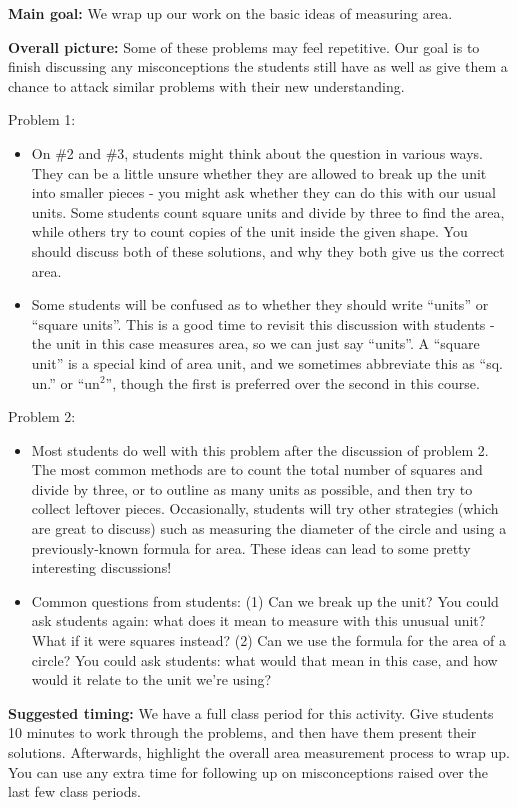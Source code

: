 \documentclass[nooutcomes,noauthor]{ximera}
\begin{document}
\newpage


\begin{instructorNotes}

{\bf Main goal:} We wrap up our work on the basic ideas of measuring area.

{\bf Overall picture:} Some of these problems may feel repetitive. Our goal is to finish discussing any misconceptions the students still have as well as give them a chance to attack similar problems with their new understanding.


Problem 1:
\begin{itemize}
\item    On \#2 and \#3, students might think about the question in various ways.  They can be a little unsure whether they are allowed to break up the unit into smaller pieces - you might ask whether they can do this with our usual units.  Some students count square units and divide by three to find the area, while others try to count copies of the unit inside the given shape.  You should discuss both of these solutions, and why they both give us the correct area.
    
\item    Some students will be confused as to whether they should write ``units'' or ``square units''.  This is a good time to revisit this discussion with students - the unit in this case measures area, so we can just say ``units''.  A ``square unit'' is a special kind of area unit, and we sometimes abbreviate this as ``sq. un.'' or ``un$^2$'', though the first is preferred over the second in this course.
\end{itemize}


Problem 2:
\begin{itemize}
\item     Most students do well with this problem after the discussion of problem 2.  The most common methods are to count the total number of squares and divide by three, or to outline as many units as possible, and then try to collect leftover pieces.  Occasionally, students will try other strategies (which are great to discuss) such as measuring the diameter of the circle and using a previously-known formula for area.  These ideas can lead to some pretty interesting discussions!
    
\item     Common questions from students: (1) Can we break up the unit?  You could ask students again: what does it mean to measure with this unusual unit?  What if it were squares instead? (2) Can we use the formula for the area of a circle?  You could ask students: what would that mean in this case, and how would it relate to the unit we're using?
\end{itemize}

{\bf Suggested timing:} We have a full class period for this activity. Give students 10 minutes to work through the problems, and then have them present their solutions. Afterwards, highlight the overall area measurement process to wrap up. You can use any extra time for following up on misconceptions raised over the last few class periods.


\end{instructorNotes}
\end{document}
